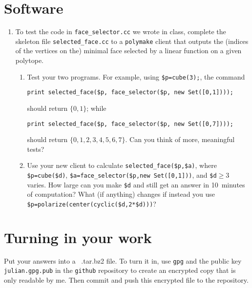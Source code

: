 \documentclass[11pt]{amsart}
\begin{document}
 \bigskip
 \section*{Software}

 \begin{enumerate}
   \setlength{\itemsep}{2ex}
 \item To test the code in \texttt{face\_selector.cc} we wrote in class, complete the skeleton file \texttt{selected\_face.cc} to a \texttt{polymake} client that outputs the (indices of the vertices on the) minimal face selected by a linear function on a given polytope. 
\begin{enumerate}
\item Test your two programs. For example, using \verb|$p=cube(3);|,
  the command 
\begin{verbatim}
print selected_face($p, face_selector($p, new Set([0,1])));
\end{verbatim}
should return $\{0,1\}$; while 
\begin{verbatim}
print selected_face($p, face_selector($p, new Set([0,7])));
\end{verbatim}
should return  $\{0,1,2,3,4,5,6,7\}$. Can you think of more, meaningful tests?

\item Use your new client to calculate \verb|selected_face($p,$a)|, where \verb|$p=cube($d)|, \verb|$a=face_selector($p,new Set([0,1]))|, and \verb|$d|${}\ge3$ varies. How large can you make \verb|$d| and still get an answer in 10~minutes of computation? What (if anything) changes if instead you use \verb|$p=polarize(center(cyclic($d,2*$d)))|? 
\end{enumerate}
 \end{enumerate}


\bigskip
\section*{Turning in your work}

Put your answers into a \ .tar.bz2 file. To turn it in, use \texttt{gpg} and the public key \texttt{julian.gpg.pub} in the \texttt{github} repository to create an encrypted copy that is only readable by me. Then commit and push this encrypted file to the repository.
\end{document}
